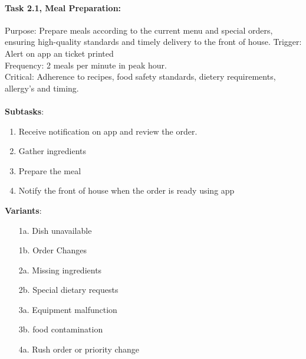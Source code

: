 \documentclass{article}
\begin{document}
\paragraph{Task 2.1, Meal Preparation:}
Purpose: Prepare meals according to the current menu and special orders, ensuring high-quality standards and timely delivery to the front of house.
Trigger: Alert on app an ticket printed\\
Frequency: 2 meals per minute in peak hour.\\
Critical: Adherence to recipes, food safety standards, dietery requirements, allergy's and timing.\\
\\
\textbf{Subtasks}:
\begin{enumerate}
    \item Receive notification on app and review the order.
    \item Gather ingredients
    \item Prepare the meal
    \item Notify the front of house when the order is ready using app
\end{enumerate}
\textbf{Variants}:
\begin{enumerate}
    \item [1a.] Dish unavailable
    \item [1b.] Order Changes
    \item [2a.] Missing ingredients
    \item [2b.] Special dietary requests
    \item [3a.] Equipment malfunction
    \item [3b.] food contamination
    \item [4a.] Rush order or priority change
\end{enumerate}
\end{document}
